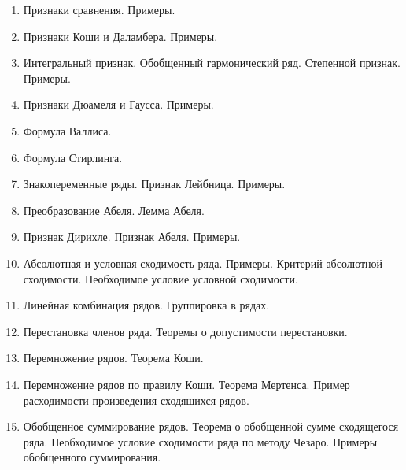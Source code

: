 \documentclass[../main.tex]{subfiles}
\begin{document}
\begin{enumerate}
  \item Признаки сравнения. Примеры.
  \item Признаки Коши и Даламбера. Примеры.
  \item Интегральный признак. Обобщенный гармонический ряд. Степенной признак. 
  Примеры.
  \item Признаки Дюамеля и Гаусса. Примеры.
  \item Формула Валлиса.
  \item Формула Стирлинга.
  \item Знакопеременные ряды. Признак Лейбница. Примеры.
  \item Преобразование Абеля. Лемма Абеля.
  \item Признак Дирихле. Признак Абеля. Примеры.
  \item Абсолютная и условная сходимость ряда. Примеры. Критерий абсолютной 
  сходимости. Необходимое условие условной сходимости.
  \item Линейная комбинация рядов. Группировка в рядах.
  \item Перестановка членов ряда. Теоремы о допустимости перестановки.
  \item Перемножение рядов. Теорема Коши.
  \item Перемножение рядов по правилу Коши. Теорема Мертенса. Пример 
  расходимости произведения сходящихся рядов.
  \item Обобщенное суммирование рядов. Теорема о обобщенной сумме сходящегося 
  ряда. Необходимое условие сходимости ряда по методу Чезаро. Примеры 
  обобщенного суммирования.
 \end{enumerate}
\end{document}
